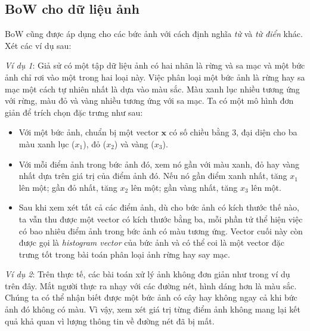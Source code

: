 
  
\subsection{BoW cho dữ liệu ảnh}
BoW cũng được áp dụng cho các bức ảnh với cách định nghĩa \textit{từ} và
\textit{từ điển} khác. Xét các ví dụ sau:
 
\textit{Ví dụ 1}: Giả sử có một tập dữ liệu ảnh có hai nhãn là rừng và sa mạc và một bức ảnh chỉ rơi vào một trong hai loại này. Việc phân
loại một bức ảnh là rừng hay sa mạc một cách tự nhiên nhất là dựa vào màu sắc.
Màu xanh lục nhiều tương ứng với rừng, màu đỏ và vàng nhiều tương ứng với sa mạc. Ta có một mô hình đơn giản để trích chọn đặc trưng như sau:
\begin{itemize}
    \item Với một bức ảnh, chuẩn bị một vector $\mathbf{x}$ có số chiều bằng 3,
    đại diện cho ba màu xanh lục ($x_1$), đỏ ($x_2$) và vàng ($x_3$).  

    \item Với mỗi điểm ảnh trong bức ảnh đó, xem nó gần với màu xanh, đỏ hay
    vàng nhất dựa trên giá trị của điểm ảnh đó. Nếu nó gần điểm xanh nhất, tăng
    $x_1$ lên một; gần đỏ nhất, tăng $x_2$ lên một; gần vàng nhất, tăng $x_3$
    lên một.

    \item Sau khi xem xét tất cả các điểm ảnh, dù cho bức ảnh có kích thước thế
    nào, ta vẫn thu được một vector có kích thước bằng ba, mỗi phần tử thể hiện
    việc có bao nhiêu điểm ảnh trong bức ảnh có màu tương ứng. Vector cuối này còn
    được gọi là \textit{histogram vector} của bức ảnh và có thể coi là một vector đặc trưng tốt trong bài toán phân loại
    ảnh rừng hay say mạc. 
\end{itemize} 
  
\textit{Ví dụ 2}: Trên thực tế, các bài toán xử lý ảnh không đơn giản như trong
ví dụ trên đây. Mắt người thực ra nhạy với các đường nét, hình dáng hơn là màu
sắc. Chúng ta có thể nhận biết được một bức ảnh có cây hay không ngay cả khi bức
ảnh đó không có màu. Vì vậy, xem xét giá trị từng điểm ảnh không mang lại kết
quả khả quan vì lượng thông tin về đường nét đã bị mất.

